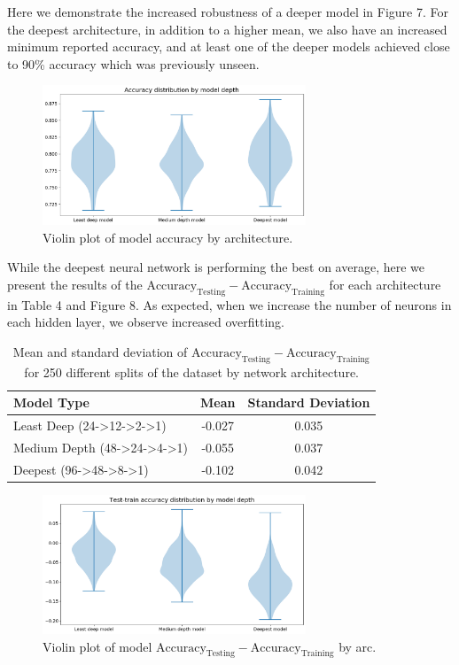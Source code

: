 \documentclass[12pt]{article}
\begin{document}
Here we demonstrate the increased robustness of a deeper model in Figure 7. For the deepest architecture, in addition to a higher mean, we also have an increased minimum reported accuracy, and at least one of the deeper models achieved close to 90\% accuracy which was previously unseen. 

\begin{figure}[H]
\centering
\includegraphics[width=0.7\textwidth]{testOut128}
\caption{ Violin plot of model accuracy by architecture.}
\end{figure}

While the deepest neural network is performing the best on average, here we present the results of the $\text{Accuracy}_{\text{Testing}} - \text{Accuracy}_{\text{Training}}$ for each architecture in Table 4 and Figure 8. As expected, when we increase the number of neurons in each hidden layer, we observe increased overfitting. 

\begin{table}[H]
\centering
\begin{tabular}{|l|c|c|}
\hline
\multicolumn{1}{|l|}{Model Type} & Mean & \multicolumn{1}{l|}{Standard Deviation} \\ \hline
Least Deep (24-\textgreater{}12-\textgreater{}2-\textgreater{}1) & -0.027 & 0.035 \\
\hline
Medium Depth (48-\textgreater{}24-\textgreater{}4-\textgreater{}1) & -0.055 & 0.037 \\
\hline
Deepest (96-\textgreater{}48-\textgreater{}8-\textgreater{}1) & -0.102 & 0.042 \\
\hline
\end{tabular}
\caption{ Mean and standard deviation of $\text{Accuracy}_{\text{Testing}} - \text{Accuracy}_{\text{Training}}$ for 250 different splits of the dataset by network architecture.}
\end{table}

\begin{figure}[H]
\centering
\includegraphics[width=0.7\textwidth]{testOut1289}
\caption{ Violin plot of model $\text{Accuracy}_{\text{Testing}} - \text{Accuracy}_{\text{Training}}$ by arc.}
\end{figure}
\end{document}
